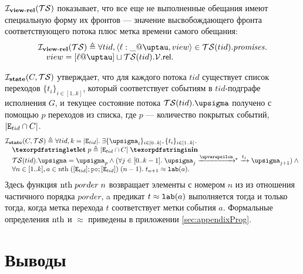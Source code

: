   $\mathcal{I}_{\rm \bf view\text{-}rel}(\mathcal{TS})$ показывает, что все еще не выполненные обещания имеют специальную форму
  их фронтов --- значение высвобождающего фронта соответствующего потока плюс метка времени самого обещания:
  \[\inarr{
  \invViewRel(\TSf) \defeq \forall tid, \msg{\loc}{\_}{\tau}{view} \in \TSf(tid).\PromSet. \\
    \quad view = [\loc @ \tau] \sqcup \TSf(tid).\View.\viewfRel. \\
  }\]

  $\mathcal{I}_{\rm \bf state}(C, \mathcal{TS})$ утверждает, что для каждого потока $tid$ существует список переходов $\{t_i\}_{i \in [1..k]}$,
  который соответствует событиям в $tid$-подграфе исполнения $G$, и текущее состояние потока $\TSf(tid).\sigma$
  получено с помощью $p$ переходов из списка, где $p$ --- количество покрытых событий, $|{\mathtt{E}}_{tid} \cap C|$.
  \[\inarr{
  \invState(C, \TSf) \defeq \forall tid, k = |\lEID|. \;
     \exists \{\pstate_i\}_{i \in [0 .. k]}, \{t_i\}_{i \in [1..k]}. \; \\
  \quad \letdef{p}{|\lEID \cap C|} \\
  \quad \TSf(tid).\pstate = \pstate_{p} \land 
    (\forall j \in [0..k-1]. \; \pstate_j \astep{\epsilon}\!\!^{*}\astep{t_j} \pstate_{j + 1})\land {} \\
  \quad \forall n \in [1..k], a \in \nthf \; ([\lEID]; \lPO; [\lEID]) \; (n - 1). \;
    t_{n + 1} \approx \lLAB(a).
  }\]
  Здесь функция $\mathrm{nth} \; porder \; n$ возвращает
  элементы с номером $n$ из из отношения частичного порядка $porder$, 
  a предикат $t \approx {\mathtt{lab}}(a)$ выполняется тогда и только тогда, когда метка перехода $t$
  соответствует метки события $a$.
  Формальные определения  $\mathrm{nth}$ и $\approx$ приведены в приложении \ref{sec:appendixProg}.



\section{Выводы}
